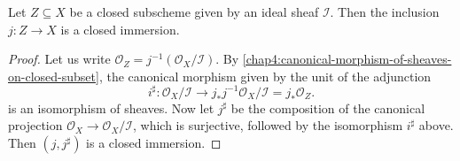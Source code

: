 \documentclass[12pt]{book}
\theoremstyle{definition}
\begin{document}
	\begin{lemma}
		Let $Z \subseteq X$ be a closed subscheme given by an ideal sheaf $\mathcal{I}$. Then the inclusion $j \colon Z \to X$ is a closed immersion.
	\end{lemma}
	\begin{proof}
		Let us write $\mathcal{O}_Z = j^{-1}(\mathcal{O}_X/\mathcal{I})$. By \cref{chap4:canonical-morphism-of-sheaves-on-closed-subset}, the canonical morphism given by the unit of the adjunction
		\begin{equation*}
			i^\sharp \colon \mathcal{O}_X/\mathcal{I} \to j_\ast j^{-1}\mathcal{O}_X/\mathcal{I} = j_\ast \mathcal{O}_Z.
		\end{equation*}
		is an isomorphism of sheaves. Now let $j^\sharp$ be the composition of the canonical projection $\mathcal{O}_X \to \mathcal{O}_X/\mathcal{I}$, which is surjective, followed by the isomorphism $i^\sharp$ above. Then $(j, j^\sharp)$ is a closed immersion.
	\end{proof}
	
\end{document}
